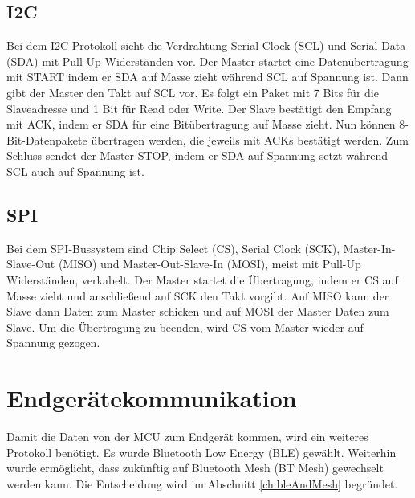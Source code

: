 \subsection{I2C}
Bei dem I2C-Protokoll sieht die Verdrahtung Serial Clock (SCL) und Serial Data (SDA) mit Pull-Up Widerständen vor.
Der Master startet eine Datenübertragung mit START indem er SDA auf Masse zieht während SCL auf Spannung ist.
Dann gibt der Master den Takt auf SCL vor.
Es folgt ein Paket mit 7 Bits für die Slaveadresse und 1 Bit für Read oder Write.
Der Slave bestätigt den Empfang mit ACK, indem er SDA für eine Bitübertragung auf Masse zieht.
Nun können 8-Bit-Datenpakete übertragen werden, die jeweils mit ACKs bestätigt werden.
Zum Schluss sendet der Master STOP, indem er SDA auf Spannung setzt während SCL auch auf Spannung ist. \cite{manual_i2c}

\subsection{SPI}
Bei dem SPI-Bussystem sind Chip Select (CS), Serial Clock (SCK), Master-In-Slave-Out (MISO) und Master-Out-Slave-In (MOSI), meist mit Pull-Up Widerständen, verkabelt.
Der Master startet die Übertragung, indem er CS auf Masse zieht und anschließend auf SCK den Takt vorgibt.
Auf MISO kann der Slave dann Daten zum Master schicken und auf MOSI der Master Daten zum Slave.
Um die Übertragung zu beenden, wird CS vom Master wieder auf Spannung gezogen. \cite{site_micSpi}

\section{Endgerätekommunikation}
Damit die Daten von der MCU zum Endgerät kommen, wird ein weiteres Protokoll benötigt.
Es wurde Bluetooth Low Energy (BLE) gewählt.
Weiterhin wurde ermöglicht, dass zukünftig auf Bluetooth Mesh (BT Mesh) gewechselt werden kann.
Die Entscheidung wird im Abschnitt \ref{ch:bleAndMesh} begründet.

